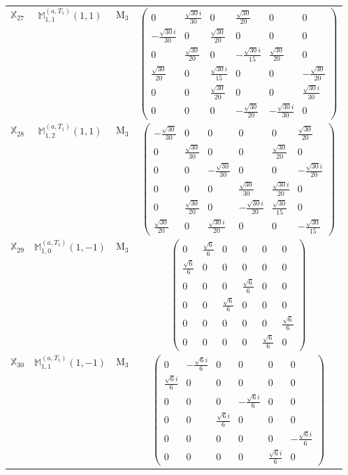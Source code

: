 \documentclass[fleqn,10pt,landscape]{article}
\begin{document}
\begin{itemize}
\begin{center}
\begin{longtable}{c|c|c|c}
$ \mathbb{X}_{27} $ & $\mathbb{M}_{1,1}^{(a,T_{1})}(1,1)$ & M$_{3}$ & $\begin{pmatrix} 0 & \frac{\sqrt{30} i}{30} & 0 & \frac{\sqrt{30}}{20} & 0 & 0 \\ - \frac{\sqrt{30} i}{30} & 0 & \frac{\sqrt{30}}{20} & 0 & 0 & 0 \\ 0 & \frac{\sqrt{30}}{20} & 0 & - \frac{\sqrt{30} i}{15} & \frac{\sqrt{30}}{20} & 0 \\ \frac{\sqrt{30}}{20} & 0 & \frac{\sqrt{30} i}{15} & 0 & 0 & - \frac{\sqrt{30}}{20} \\ 0 & 0 & \frac{\sqrt{30}}{20} & 0 & 0 & \frac{\sqrt{30} i}{30} \\ 0 & 0 & 0 & - \frac{\sqrt{30}}{20} & - \frac{\sqrt{30} i}{30} & 0 \end{pmatrix}$ \\
$ \mathbb{X}_{28} $ & $\mathbb{M}_{1,2}^{(a,T_{1})}(1,1)$ & M$_{3}$ & $\begin{pmatrix} - \frac{\sqrt{30}}{30} & 0 & 0 & 0 & 0 & \frac{\sqrt{30}}{20} \\ 0 & \frac{\sqrt{30}}{30} & 0 & 0 & \frac{\sqrt{30}}{20} & 0 \\ 0 & 0 & - \frac{\sqrt{30}}{30} & 0 & 0 & - \frac{\sqrt{30} i}{20} \\ 0 & 0 & 0 & \frac{\sqrt{30}}{30} & \frac{\sqrt{30} i}{20} & 0 \\ 0 & \frac{\sqrt{30}}{20} & 0 & - \frac{\sqrt{30} i}{20} & \frac{\sqrt{30}}{15} & 0 \\ \frac{\sqrt{30}}{20} & 0 & \frac{\sqrt{30} i}{20} & 0 & 0 & - \frac{\sqrt{30}}{15} \end{pmatrix}$ \\
$ \mathbb{X}_{29} $ & $\mathbb{M}_{1,0}^{(a,T_{1})}(1,-1)$ & M$_{3}$ & $\begin{pmatrix} 0 & \frac{\sqrt{6}}{6} & 0 & 0 & 0 & 0 \\ \frac{\sqrt{6}}{6} & 0 & 0 & 0 & 0 & 0 \\ 0 & 0 & 0 & \frac{\sqrt{6}}{6} & 0 & 0 \\ 0 & 0 & \frac{\sqrt{6}}{6} & 0 & 0 & 0 \\ 0 & 0 & 0 & 0 & 0 & \frac{\sqrt{6}}{6} \\ 0 & 0 & 0 & 0 & \frac{\sqrt{6}}{6} & 0 \end{pmatrix}$ \\
$ \mathbb{X}_{30} $ & $\mathbb{M}_{1,1}^{(a,T_{1})}(1,-1)$ & M$_{3}$ & $\begin{pmatrix} 0 & - \frac{\sqrt{6} i}{6} & 0 & 0 & 0 & 0 \\ \frac{\sqrt{6} i}{6} & 0 & 0 & 0 & 0 & 0 \\ 0 & 0 & 0 & - \frac{\sqrt{6} i}{6} & 0 & 0 \\ 0 & 0 & \frac{\sqrt{6} i}{6} & 0 & 0 & 0 \\ 0 & 0 & 0 & 0 & 0 & - \frac{\sqrt{6} i}{6} \\ 0 & 0 & 0 & 0 & \frac{\sqrt{6} i}{6} & 0 \end{pmatrix}$ \\

\end{longtable}
\end{center}
\end{itemize}
\end{document}
